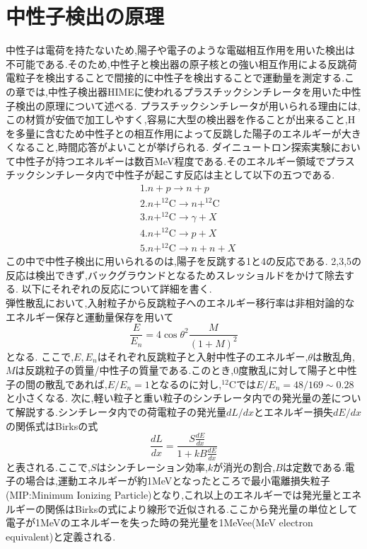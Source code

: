 \documentclass[dvipdfmx]{jsreport}
\begin{document}
\section{中性子検出の原理}
中性子は電荷を持たないため,陽子や電子のような電磁相互作用を用いた検出は不可能である.そのため,中性子と検出器の原子核との強い相互作用による反跳荷電粒子を検出することで間接的に中性子を検出することで運動量を測定する.この章では,中性子検出器HIMEに使われるプラスチックシンチレータを用いた中性子検出の原理について述べる.
プラスチックシンチレータが用いられる理由には,この材質が安価で加工しやすく,容易に大型の検出器を作ることが出来ること,Hを多量に含むため中性子との相互作用によって反跳した陽子のエネルギーが大きくなること,時間応答がよいことが挙げられる.
ダイニュートロン探索実験において中性子が持つエネルギーは数百MeV程度である.そのエネルギー領域でプラスチックシンチレータ内で中性子が起こす反応は主として以下の五つである.\begin{equation}\begin{split}&1.n+p\rightarrow n+p\\&2.n+^{12}\mathrm{C}\rightarrow n+^{12}\mathrm{C}
\\&3.n+^{12}\mathrm{C}\rightarrow \gamma+X
\\&4.n+^{12}\mathrm{C}\rightarrow p+X
\\&5.n+^{12}\mathrm{C}\rightarrow n+n+X
\end{split}\end{equation}
この中で中性子検出に用いられるのは,陽子を反跳する1と4の反応である.
2,3,5の反応は検出できず,バックグラウンドとなるためスレッショルドをかけて除去する.
以下にそれぞれの反応について詳細を書く.\\
弾性散乱において,入射粒子から反跳粒子へのエネルギー移行率は非相対論的なエネルギー保存と運動量保存を用いて\[\frac{E}{E_n}=4\cos{\theta}^2\frac{M}{(1+M)^2}\]となる.
ここで,$E,E_n$はそれぞれ反跳粒子と入射中性子のエネルギー,$\theta$は散乱角,$M$は反跳粒子の質量/中性子の質量である.このとき,0度散乱に対して陽子と中性子の間の散乱であれば,$E/E_n=1$となるのに対し,$^{12}\mathrm{C}$では$E/E_n=48/169\sim0.28$と小さくなる.
次に,軽い粒子と重い粒子のシンチレータ内での発光量の差について解説する.シンチレータ内での荷電粒子の発光量$dL/dx$とエネルギー損失$dE/dx$の関係式はBirksの式\[\frac{dL}{dx}=\frac{S\frac{dE}{dx}}{1+kB\frac{dE}{dx}}\]と表される.ここで,$S$はシンチレーション効率,$k$が消光の割合,$B$は定数である.電子の場合は,運動エネルギーが約1MeVとなったところで最小電離損失粒子(MIP:Minimum Ionizing Particle)となり,これ以上のエネルギーでは発光量とエネルギーの関係はBirksの式により線形で近似される.ここから発光量の単位として電子が1MeVのエネルギーを失った時の発光量を1MeVee(MeV electron equivalent)と定義される.
\end{document}
